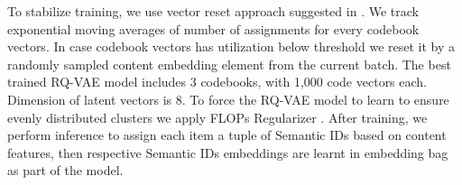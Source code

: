 To stabilize training, we use vector reset approach suggested in  \cite{singh2024bettergeneralizationsemanticids, zeghidour2021soundstreamendtoendneuralaudio}. We track exponential moving averages of number of assignments for every codebook vectors. In case codebook vectors has  utilization below threshold we reset it by a randomly sampled content embedding element from the current batch. 
The best trained RQ-VAE model includes 3 codebooks, with 1,000 code vectors each. Dimension of latent vectors is 8. To force the RQ-VAE model to learn to ensure evenly distributed clusters we apply FLOPs Regularizer \cite{paria2020minimizingflopslearnefficient}. After training, we perform inference to assign each item a tuple of Semantic IDs based on content features, then respective Semantic IDs embeddings are learnt in embedding bag as part of the {\systemname} model.






